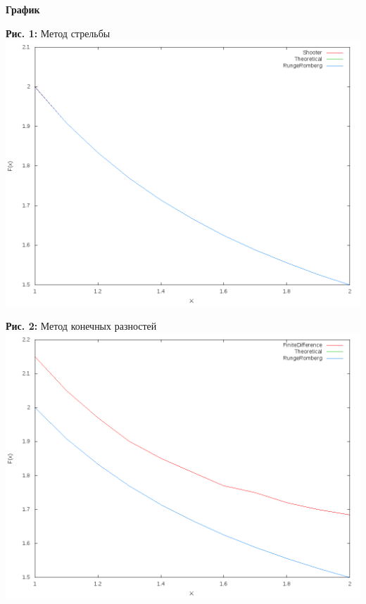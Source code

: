 \pagebreak

\textbf{График}

\begin{center}
\textbf{Рис. 1:} Метод стрельбы\\
\includegraphics[scale=0.5]{images/graphic4_2Shooter.png}\\
\end{center}
\pagebreak
\begin{center}
\textbf{Рис. 2:} Метод конечных разностей\\
\includegraphics[scale=0.5]{images/graphic4_2FiniteDifference.png}\\
\end{center}

\pagebreak

